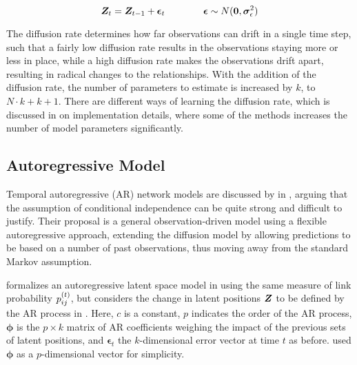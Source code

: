     \begin{equation}\label{eq:dsnl-latent-space}
        \bm{Z}_t = \bm{Z}_{t-1} + \bm{\epsilon}_t \qquad\qquad \bm{\epsilon} \sim N(\bm{0},\bm{\sigma}_\epsilon^2)
    \end{equation}
    
    The diffusion rate determines how far observations can drift in a single time step, such that a fairly low diffusion rate results in the observations staying more or less in place, while a high diffusion rate makes the observations drift apart, resulting in radical changes to the relationships. With the addition of the diffusion rate, the number of parameters to estimate is increased by $k$, to $N\cdot k + k + 1$. There are different ways of learning the diffusion rate, which is discussed in  on implementation details, where some of the methods increases the number of model parameters significantly.
    
    

\subsection{Autoregressive Model}

    Temporal autoregressive (AR) network models are discussed by \citeauthor{sewell2018simultaneous} in \cite{sewell2018simultaneous}, arguing that the assumption of conditional independence can be quite strong and difficult to justify. Their proposal is a general observation-driven model using a flexible autoregressive approach, extending the diffusion model by allowing predictions to be based on a number of past observations, thus moving away from the standard Markov assumption. 
    
    \citeauthor{zangenberg2018a} formalizes an autoregressive latent space model in \cite{zangenberg2018a} using the same measure of link probability $\sub(p)^\t$, but considers the change in latent positions $\bm{Z}$ to be defined by the AR process in . Here, $c$ is a constant, $p$ indicates the order of the AR process, $\bm{\phi}$ is the $p\times k$ matrix of AR coefficients weighing the impact of the previous sets of latent positions, and $\bm{\epsilon}_t$ the $k$-dimensional error vector at time $t$ as before. \citeauthor{zangenberg2018a} used $\bm{\phi}$ as a $p$-dimensional vector for simplicity.
    
